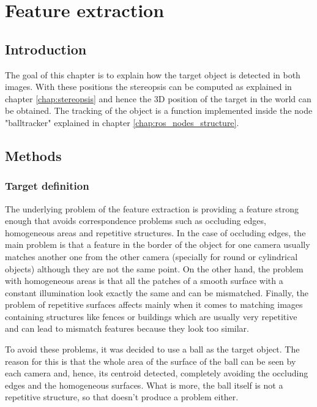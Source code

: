 \chapter{Feature extraction} %
\label{chap:feature_extraction}
\section{Introduction}
The goal of this chapter is to explain how the target object is detected in both images. With these positions the stereopsis can be computed as explained in chapter \ref{chap:stereopsis} and hence the 3D position of the target in the world can be obtained.
The tracking of the object is a function implemented inside the node "balltracker" explained in chapter \ref{chap:ros_nodes_structure}.

\section{Methods}

\subsection{Target definition}
The underlying problem of the feature extraction is providing a feature strong enough that avoids correspondence problems such as occluding edges, homogeneous areas and repetitive structures.
In the case of occluding edges, the main problem is that a feature in the border of the object for one camera usually matches another one from the other camera (specially for round or cylindrical objects) although they are not the same point.
On the other hand, the problem with homogeneous areas is that all the patches of a smooth surface with a constant illumination look exactly the same and can be mismatched.
Finally, the problem of repetitive surfaces affects mainly when it comes to matching images containing structures like fences or buildings which are usually very repetitive and can lead to mismatch features because they look too similar.

To avoid these problems, it was decided to use a ball as the target object.
The reason for this is that the whole area of the surface of the ball can be seen by each camera and, hence, its centroid detected, completely avoiding the occluding edges and the homogeneous surfaces.
What is more, the ball itself is not a repetitive structure, so that doesn't produce a problem either.

